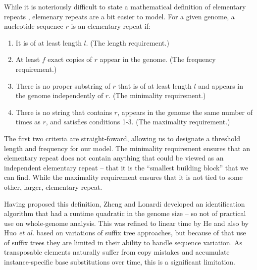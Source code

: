 \documentclass{bmcart}
\begin{document}
While it is noteriously difficult to state a mathematical definition
of elementary repeats \cite{Bao:2002}, elemenary repeats are a bit
easier to model.  For a given genome, a nucleotide sequence $r$ is an
elementary repeat if:
\begin{enumerate}
\item It is of at least length $l$.  (The length requirement.)
\item At least $f$ exact copies of $r$ appear in the genome.  (The
  frequency requirement.)
\item There is no proper substring of $r$ that is of at least length
  $l$ and appears in the genome independently of $r$. (The minimality
  requirement.)
\item There is no string that contains $r$, appears in the genome
  the same number of times as $r$, and satisfies conditions 1-3.  (The
  maximality requirement.)
\end{enumerate}
The first two criteria are straight-foward, allowing us to designate a
threshold length and frequency for our model.  The minimality
requirement ensures that an elementary repeat does not contain
anything that could be viewed as an independent elementary repeat --
that it is the ``smallest building block'' that we can find.  While
the maximality requirement ensures that it is not tied to some other, larger,
elementary repeat.


Having proposed this definition, Zheng and Lonardi developed an
identification algorithm that had a runtime quadratic in the genome
size -- so not of practical use on whole-genome analysis.  This was
refined to linear time by He and also by Huo {\it et al.}
\cite{He:2006gpa,Huo:2009hoa} based on variations of suffix tree
approaches, but because of that use of suffix trees they are limited
in their ability to handle sequence variation.  As transposable
elements naturally suffer from copy mistakes and accumulate
instance-specific base substitutions over time, this is a significant
limitation.
\end{document}
